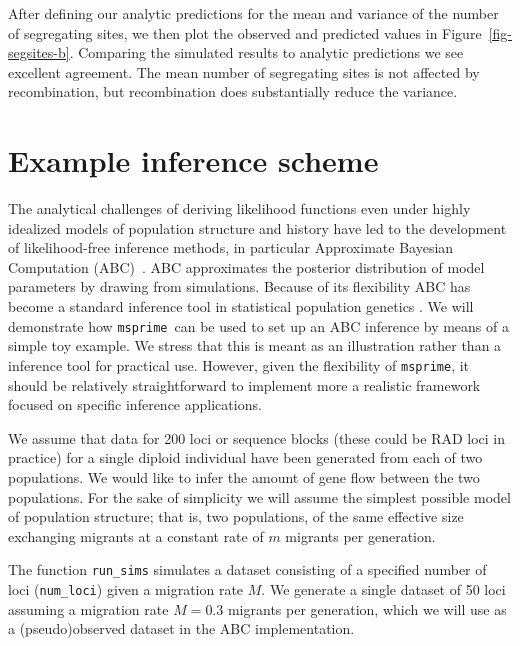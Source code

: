 \documentclass[graybox]{svmult}
\newcommand{\msprime}[0]{\texttt{msprime}}
\begin{document}
After defining our analytic predictions for the mean and variance of the
number of segregating sites, we then plot the observed and predicted values
in Figure~\ref{fig-segsites-b}.
Comparing the simulated results to analytic predictions we see
excellent agreement. The mean number of segregating sites is not
affected by recombination, but recombination does substantially reduce
the variance.

\section{Example inference scheme}\label{sec:inference}

    The analytical challenges of deriving likelihood functions even under
highly idealized models of population structure and history have led to
the development of likelihood-free inference methods, in particular
Approximate Bayesian Computation (ABC)~\citep{Beaumont2002}.
ABC approximates the posterior distribution of model parameters by drawing from
simulations. Because of its flexibility ABC has become a standard
inference tool in statistical population genetics \citep[see][for a review]{csillery2010approximate}.
We will demonstrate how \msprime\ can be used to set up an ABC inference
by means of a simple toy example. We stress that this is meant as an
illustration rather than a inference tool for practical use. However,
given the flexibility of \msprime, it should be
relatively straightforward to implement more a realistic framework focused
on specific inference applications.

We assume that data for 200 loci or sequence blocks (these could be RAD
loci in practice) for a single diploid individual have been generated
from each of two populations. We would like to infer the amount of gene
flow between the two populations. For the sake of simplicity we will
assume the simplest possible model of population structure; that is, two
populations, of the same effective size exchanging migrants at a
constant rate of $m$ migrants per generation.

The function \texttt{run\_sims} simulates a dataset consisting of a
specified number of loci (\texttt{num\_loci}) given a migration rate
\(M\). We generate a single dataset of 50 loci assuming a migration rate
\(M=0.3\) migrants per generation, which we will use as a (pseudo)observed dataset in the ABC
implementation.
\end{document}
